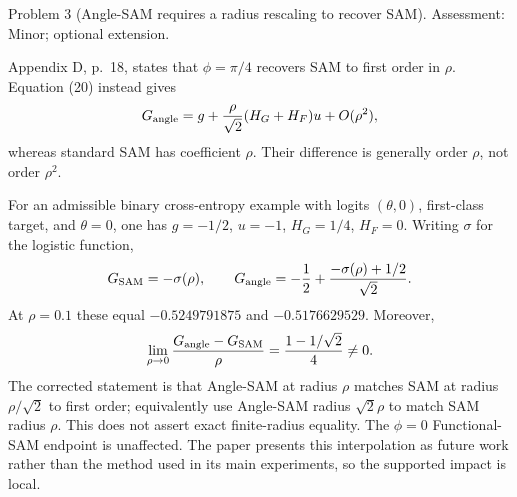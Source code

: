 \documentclass[10pt]{article}
\begin{document}
Problem 3 (Angle-SAM requires a radius rescaling to recover SAM).  Assessment: Minor; optional extension.\par
Appendix D, p. 18, states that \(\phi=\pi/4\) recovers SAM to first order in \(\rho\). Equation (20) instead gives \[G_{\rm angle}=g+\frac{\rho}{\sqrt2}(H_G+H_F)u+O(\rho^2),\] whereas standard SAM has coefficient \(\rho\). Their difference is generally order \(\rho\), not order \(\rho^2\).\par
For an admissible binary cross-entropy example with logits \((\theta,0)\), first-class target, and \(\theta=0\), one has \(g=-1/2\), \(u=-1\), \(H_G=1/4\), \(H_F=0\). Writing \(\sigma\) for the logistic function, \[G_{\rm SAM}=-\sigma(\rho),\qquad
 G_{\rm angle}=-\frac12+
       \frac{-\sigma(\rho)+1/2}{\sqrt2}.\] At \(\rho=0.1\) these equal \(-0.5249791875\) and \(-0.5176629529\). Moreover, \[\lim_{\rho\to0}\frac{G_{\rm angle}-G_{\rm SAM}}{\rho}
 =\frac{1-1/\sqrt2}{4}\ne0.\] The corrected statement is that Angle-SAM at radius \(\rho\) matches SAM at radius \(\rho/\sqrt2\) to first order; equivalently use Angle-SAM radius \(\sqrt2\rho\) to match SAM radius \(\rho\). This does not assert exact finite-radius equality. The \(\phi=0\) Functional-SAM endpoint is unaffected. The paper presents this interpolation as future work rather than the method used in its main experiments, so the supported impact is local.\par
\end{document}
